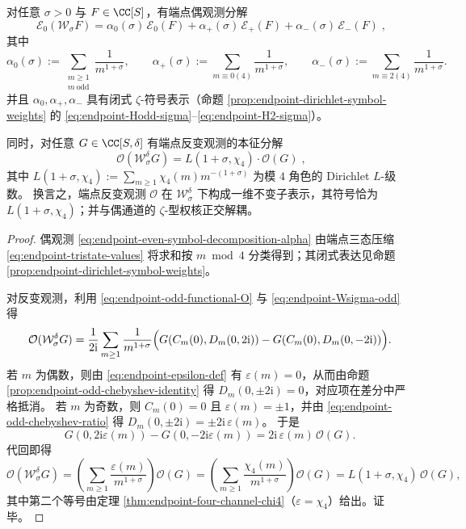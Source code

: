 \begin{theorem}\label{thm:endpoint-zeta-Lchi4-symbol-pair}
对任意 \(\sigma>0\) 与 \(F\in\CC[S]\)，有端点偶观测分解
\begin{equation}\label{eq:endpoint-even-symbol-decomposition-alpha}
\boxed{\;
\mathcal E_{0}(\mathcal W_{\sigma}F)
=\alpha_{0}(\sigma)\,\mathcal E_{0}(F)+\alpha_{+}(\sigma)\,\mathcal E_{+}(F)+\alpha_{-}(\sigma)\,\mathcal E_{-}(F)\; },
\end{equation}
其中
\[
\alpha_{0}(\sigma):=\sum_{\substack{m\ge 1\\ m\ \mathrm{odd}}}\frac{1}{m^{1+\sigma}},\qquad
\alpha_{+}(\sigma):=\sum_{m\equiv 0(4)}\frac{1}{m^{1+\sigma}},\qquad
\alpha_{-}(\sigma):=\sum_{m\equiv 2(4)}\frac{1}{m^{1+\sigma}}.
\]
并且 \(\alpha_{0},\alpha_{+},\alpha_{-}\) 具有闭式 \(\zeta\)-符号表示（命题 \ref{prop:endpoint-dirichlet-symbol-weights} 的 \eqref{eq:endpoint-Hodd-sigma}--\eqref{eq:endpoint-H2-sigma}）。
\par
同时，对任意 \(G\in\CC[S,\delta]\) 有端点反变观测的本征分解
\begin{equation}\label{eq:endpoint-odd-symbol-eigen}
\boxed{\;
\mathcal O(\mathcal W_{\sigma}^{\delta}G)
=L(1+\sigma,\chi_{4})\cdot \mathcal O(G)\; },
\end{equation}
其中
\(
L(1+\sigma,\chi_{4}):=\sum_{m\ge 1}\chi_{4}(m)m^{-(1+\sigma)}
\)
为模 \(4\) 角色的 Dirichlet \(L\)-级数。
换言之，端点反变观测 \(\mathcal O\) 在 \(\mathcal W_{\sigma}^{\delta}\) 下构成一维不变子表示，其符号恰为 \(L(1+\sigma,\chi_{4})\)；并与偶通道的 \(\zeta\)-型权核正交解耦。
\end{theorem}
\begin{proof}
偶观测 \eqref{eq:endpoint-even-symbol-decomposition-alpha} 由端点三态压缩 \eqref{eq:endpoint-tristate-values} 将求和按 \(m\bmod 4\) 分类得到；其闭式表达见命题 \ref{prop:endpoint-dirichlet-symbol-weights}。
\par
对反变观测，利用 \eqref{eq:endpoint-odd-functional-O} 与 \eqref{eq:endpoint-Wsigma-odd} 得
\[
\mathcal O(\mathcal W_{\sigma}^{\delta}G)
=\frac{1}{2\mathrm{i}}\sum_{m\ge 1}\frac{1}{m^{1+\sigma}}
\Bigl(G(C_m(0),D_m(0,2\mathrm{i}))-G(C_m(0),D_m(0,-2\mathrm{i}))\Bigr).
\]
若 \(m\) 为偶数，则由 \eqref{eq:endpoint-epsilon-def} 有 \(\varepsilon(m)=0\)，从而由命题 \ref{prop:endpoint-odd-chebyshev-identity} 得 \(D_m(0,\pm 2\mathrm{i})=0\)，对应项在差分中严格抵消。
若 \(m\) 为奇数，则 \(C_m(0)=0\) 且 \(\varepsilon(m)=\pm 1\)，并由 \eqref{eq:endpoint-odd-chebyshev-ratio} 得
\(
D_m(0,\pm 2\mathrm{i})=\pm 2\mathrm{i}\,\varepsilon(m)
\)。
于是
\[
G(0,2\mathrm{i}\varepsilon(m))-G(0,-2\mathrm{i}\varepsilon(m))
=2\mathrm{i}\,\varepsilon(m)\,\mathcal O(G).
\]
代回即得
\[
\mathcal O(\mathcal W_{\sigma}^{\delta}G)
=\left(\sum_{m\ge 1}\frac{\varepsilon(m)}{m^{1+\sigma}}\right)\mathcal O(G)
=\left(\sum_{m\ge 1}\frac{\chi_{4}(m)}{m^{1+\sigma}}\right)\mathcal O(G)
=L(1+\sigma,\chi_{4})\,\mathcal O(G),
\]
其中第二个等号由定理 \ref{thm:endpoint-four-channel-chi4}（\(\varepsilon=\chi_4\)）给出。证毕。
\end{proof}

